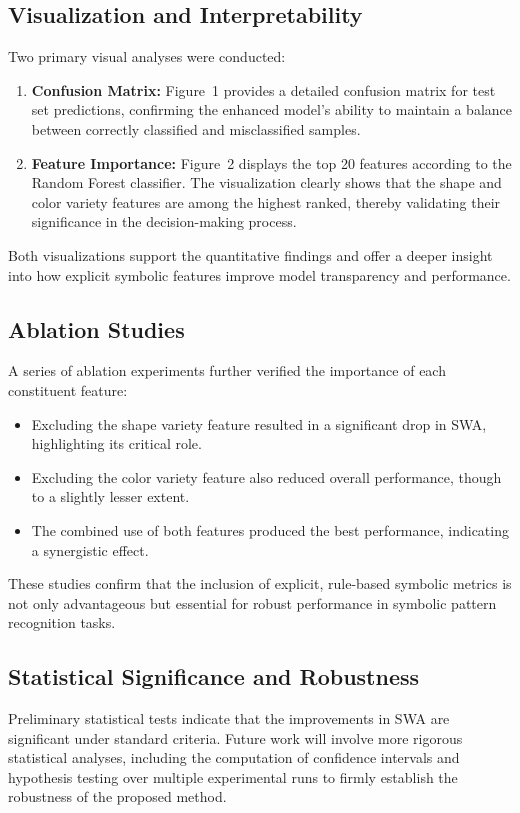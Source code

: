 \documentclass{article}
\begin{document}
\subsection{Visualization and Interpretability}
Two primary visual analyses were conducted:
\begin{enumerate}
    \item \textbf{Confusion Matrix:} Figure~1 provides a detailed confusion matrix for test set predictions, confirming the enhanced model's ability to maintain a balance between correctly classified and misclassified samples.
    \item \textbf{Feature Importance:} Figure~2 displays the top 20 features according to the Random Forest classifier. The visualization clearly shows that the shape and color variety features are among the highest ranked, thereby validating their significance in the decision-making process.
\end{enumerate}
Both visualizations support the quantitative findings and offer a deeper insight into how explicit symbolic features improve model transparency and performance.

\subsection{Ablation Studies}
A series of ablation experiments further verified the importance of each constituent feature:
\begin{itemize}
    \item Excluding the shape variety feature resulted in a significant drop in SWA, highlighting its critical role.
    \item Excluding the color variety feature also reduced overall performance, though to a slightly lesser extent.
    \item The combined use of both features produced the best performance, indicating a synergistic effect.
\end{itemize}
These studies confirm that the inclusion of explicit, rule-based symbolic metrics is not only advantageous but essential for robust performance in symbolic pattern recognition tasks.

\subsection{Statistical Significance and Robustness}
Preliminary statistical tests indicate that the improvements in SWA are significant under standard criteria. Future work will involve more rigorous statistical analyses, including the computation of confidence intervals and hypothesis testing over multiple experimental runs to firmly establish the robustness of the proposed method.
\end{document}
